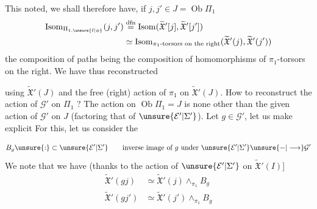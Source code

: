 This noted, we shall therefore have, if $j,j'\in J=\operatorname{Ob}\Pi_1$
\[
\begin{aligned}
\operatorname{Isom}_{\Pi_{1,\unsure{\mathrm f|\phi}}}(j,j')&\overset{\mathrm{dfn}}{=}\operatorname{Isom}(\widetilde{\mathfrak X}'[j],\widetilde{\mathfrak X}'[j'])\\
&\simeq\operatorname{Isom}_{\pi_1\text{-torsors on the right}}(\widetilde{\mathfrak X}'(j),\widetilde{\mathfrak X}'(j'))
\end{aligned}
\]
the composition of paths being the composition of homomorphisms of $\pi_1$-torsors on the right.
 We have thus reconstructed  using $\widetilde{\mathfrak X}'(J)$ and the free (right) action of $\pi_1$ on $\widetilde{\mathfrak X}'(J)$.
\deleted{[the actions} How to reconstruct the action of $\mathcal G'$ on $\Pi_1$ ? The action on $\operatorname{Ob}\Pi_1=J$ is none other than the given action of $\mathcal G'$ on $J$ (factoring that of $\unsure{\mathcal E'|\Sigma'}$). Let $g\in\mathcal G'$, let us make explicit
For this, let us consider the 
\[
B_g\unsure{:}\subset\unsure{\mathcal E'|\Sigma'}\qquad\text{inverse image of }g\text{ under }\unsure{\mathcal E'|\Sigma'}\unsure{\mathbin{-}|\longrightarrow}\mathcal G'
\]
We note that we have (thanks to the action of $\unsure{\mathcal E'|\Sigma'}$ on $\widetilde{\mathfrak X}'(I)$]
\[
\begin{aligned}
\widetilde{\mathfrak X}'(gj)&\simeq\widetilde{\mathfrak X}'(j)\mathbin{\wedge}_{\pi_1}B_g\\
\widetilde{\mathfrak X}'(gj')&\simeq\widetilde{\mathfrak X}'(j')\mathbin{\wedge}_{\pi_1}B_g
\end{aligned}
\]
